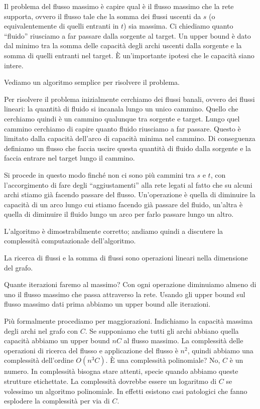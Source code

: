Il problema del flusso massimo è capire qual è il flusso massimo che la rete supporta, ovvero il
flusso tale che la somma dei flussi uscenti da $s$ (o equivalentemente di quelli entranti in $t$)
sia massima. Ci chiediamo quanto ``fluido'' riusciamo a far passare dalla sorgente al target. Un
upper bound è dato dal minimo tra la somma delle capacità degli archi uscenti dalla sorgente e la
somma di quelli entranti nel target. È un'importante ipotesi che le capacità siano intere.

Vediamo un algoritmo semplice per risolvere il problema.

Per risolvere il problema inizialmente cerchiamo dei flussi banali, ovvero dei flussi lineari: la
quantità di fluido si incanala lungo un unico cammino. Quello che cerchiamo quindi è un cammino
qualunque tra sorgente e target. Lungo quel cammino cerchiamo di capire quanto fluido riusciamo a
far passare. Questo è limitato dalla capacità dell'arco di capacità minima nel cammino. Di
conseguenza definiamo un flusso che faccia uscire questa quantità di fluido dalla sorgente e la
faccia entrare nel target lungo il cammino.

Si procede in questo modo finché non ci sono più cammini tra $s$ e $t$, con l'accorgimento di fare
degli ``aggiustamenti'' alla rete legati al fatto che su alcuni archi stiamo già facendo passare del
flusso. Un'operazione è quella di diminuire la capacità di un arco lungo cui stiamo facendo già
passare del fluido, un'altra è quella di diminuire il fluido lungo un arco per farlo passare lungo
un altro.

L'algoritmo è dimostrabilmente corretto; andiamo quindi a discutere la complessità computazionale
dell'algoritmo.

La ricerca di flussi e la somma di flussi sono operazioni lineari nella dimensione del grafo.

Quante iterazioni faremo al massimo? Con ogni operazione diminuiamo almeno di uno il flusso massimo
che passa attraverso la rete. Usando gli upper bound sul flusso massimo dati prima abbiamo un
upper bound alle iterazioni.

Più formalmente procediamo per maggiorazioni. Indichiamo la capacità massima degli archi nel grafo
con $C$. Se supponiamo che tutti gli archi abbiano quella capacità abbiamo un upper bound $nC$ al
flusso massimo. La complessità delle operazioni di ricerca del flusso e applicazione del flusso è
$n^{2}$, quindi abbiamo una complessità dell'ordine $O(n^{3}C)$. È una complessità polinomiale?  No,
$C$ è un numero. In complessità bisogna stare attenti, specie quando abbiamo queste strutture
etichettate. La complessità dovrebbe essere un logaritmo di $C$ se volessimo un algoritmo
polinomiale. In effetti esistono casi patologici che fanno esplodere la complessità per via di $C$.

